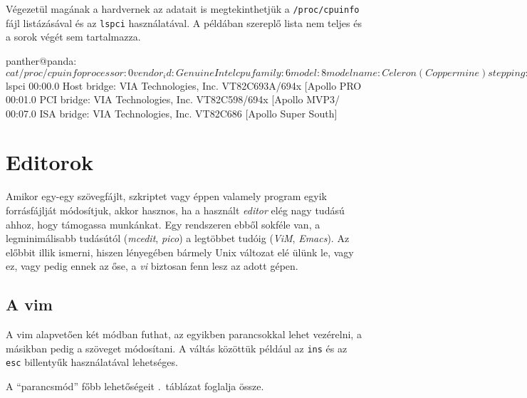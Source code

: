 Végezetül magának a hardvernek az adatait is megtekinthetjük a
\texttt{/proc/cpuinfo} fájl listázásával és az \texttt{lspci} használatával. A
példában szereplő lista nem teljes és a sorok végét sem tartalmazza.

\begin{VerbExample}
panther@panda:~$ cat /proc/cpuinfo
processor       : 0
vendor_id       : GenuineIntel
cpu family      : 6
model           : 8
model name      : Celeron (Coppermine)
stepping        : 10
cpu MHz         : 906.741
cache size      : 128 KB
fdiv_bug        : no
hlt_bug         : no
f00f_bug        : no
coma_bug        : no
fpu             : yes
fpu_exception   : yes
cpuid level     : 2
wp              : yes
flags           : fpu vme de pse tsc msr pae mce cx8
bogomips        : 1816.05

panther@panda:~$ lspci
00:00.0 Host bridge: VIA Technologies, Inc. VT82C693A/694x [Apollo PRO 
00:01.0 PCI bridge: VIA Technologies, Inc. VT82C598/694x [Apollo MVP3/
00:07.0 ISA bridge: VIA Technologies, Inc. VT82C686 [Apollo Super South]
\end{VerbExample}

\section{Editorok}%
\label{sec:editors}

Amikor egy-egy szövegfájlt, szkriptet vagy éppen valamely program egyik
forrásfájlját módosítjuk, akkor hasznos, ha a használt
\emph{editor} elég nagy tudású ahhoz, hogy támogassa munkánkat. Egy rendszeren
ebből sokféle van, a legminimálisabb tudásútól (\emph{mcedit}, \emph{pico})
a legtöbbet tudóig (\emph{ViM}, \emph{Emacs}). Az előbbit illik ismerni, hiszen
lényegében bármely Unix változat elé ülünk le, vagy ez, vagy pedig ennek az őse,
a \emph{vi} biztosan fenn lesz az adott gépen.

\subsection{A vim}

A vim alapvetően két módban futhat, az egyikben parancsokkal lehet vezérelni, a
másikban pedig a szöveget módosítani. A váltás közöttük például az \texttt{ins}
és az \texttt{esc} billentyűk használatával lehetséges.

A ``parancsmód'' főbb lehetőségeit .\ táblázat foglalja össze.

